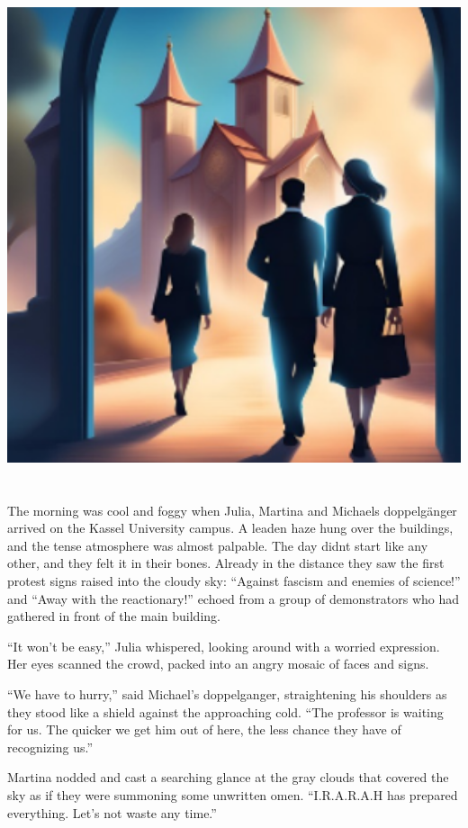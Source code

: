 \documentclass[
]{article}
\begin{document}
\includegraphics[width=5.88542in,height=5.79167in]{media/image5.png}

The morning was cool and foggy when Julia, Martina and
Michael\textquotesingle s doppelgänger arrived on the Kassel University
campus. A leaden haze hung over the buildings, and the tense atmosphere
was almost palpable. The day didn\textquotesingle t start like any
other, and they felt it in their bones. Already in the distance they saw
the first protest signs raised into the cloudy sky: ``Against fascism
and enemies of science!'' and ``Away with the reactionary!'' echoed from
a group of demonstrators who had gathered in front of the main building.

``It won't be easy,'' Julia whispered, looking around with a worried
expression. Her eyes scanned the crowd, packed into an angry mosaic of
faces and signs.

``We have to hurry,'' said Michael's doppelganger, straightening his
shoulders as they stood like a shield against the approaching cold.
``The professor is waiting for us. The quicker we get him out of here,
the less chance they have of recognizing us.''

Martina nodded and cast a searching glance at the gray clouds that
covered the sky as if they were summoning some unwritten omen.
``I.R.A.R.A.H has prepared everything. Let's not waste any time.''
\end{document}
